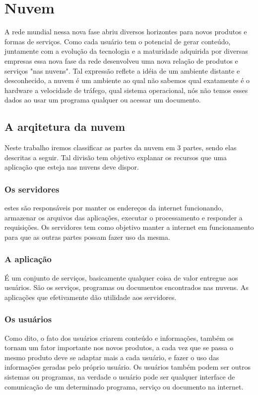 \documentclass[
	12pt,				%
	openright,			%
	twoside,			%
	a4paper,			%
	Times,
	brazil,				%
	]{abntex2}
\begin{document}
\section{Nuvem}
A rede mundial nessa nova fase abriu diversos horizontes para novos produtos e formas de serviços. Como cada usuário tem o potencial de gerar conteúdo, juntamente com a evolução da tecnologia e a maturidade adquirida por diversas empresas essa nova fase da rede desenvolveu uma nova relação de produtos e serviços "nas nuvens".
Tal expressão reflete a idéia de um ambiente distante e desconhecido, a nuvem é  um ambiente ao qual não sabemos qual exatamente é o hardware a velocidade de tráfego, qual sistema operacional, nós não temos esses dados ao usar um programa qualquer ou acessar um documento\cite{nuvem, nuvem2}.
\par

\subsection{A arqitetura da nuvem}
Neste trabalho iremos classificar as partes da nuvem em 3 partes, sendo elas descritas a seguir. Tal divisão tem objetivo explanar os recursos que uma aplicação que esteja nas nuvens deve dispor\cite{nuvem, nuvem2}.
\par

\subsubsection{Os servidores}
estes são responsáveis por manter os endereços da internet funcionando,  armazenar os arquivos das aplicações, executar o processamento e responder a requisições. Os servidores tem como objetivo manter a internet em funcionamento para que as outras partes possam fazer uso da mesma\cite{nuvem, nuvem2}.
\par

\subsubsection{A aplicação}
É um conjunto de serviços, basicamente qualquer coisa de valor entregue aos usuários. São os serviços, programas ou documentos encontrados nas nuvens. As aplicações que efetivamente dão utilidade aos servidores\cite{nuvem, nuvem2}.
\par

\subsubsection{Os usuários}
Como dito, o fato dos usuários criarem conteúdo e informações, também os tornam um fator importante nos novos produtos, a cada vez que se passa o mesmo produto deve se adaptar mais a cada usuário, e fazer o uso das informações geradas pelo próprio usuário. Os usuários também podem ser outros sistemas ou programas, na verdade o usuário pode ser qualquer interface de comunicação de um determinado programa, serviço ou documento na internet\cite{nuvem, nuvem2}.
\par
\end{document}
